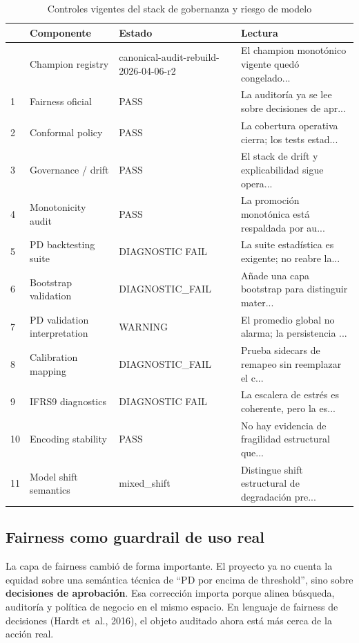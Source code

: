\documentclass[
  spanish,
  11pt,
  letterpaper,
]{scrbook}
\theoremstyle{plain}
\theoremstyle{remark}
\begin{document}
{

\begin{longtable}[]{@{}llll@{}}

\caption{\label{tbl-mrm-current-controls}Controles vigentes del stack de
gobernanza y riesgo de modelo}

\tabularnewline

\toprule\noalign{}
& Componente & Estado & Lectura \\
\midrule\noalign{}
\endhead
\bottomrule\noalign{}
\endlastfoot
0 & Champion registry & canonical-audit-rebuild-2026-04-06-r2 & El
champion monotónico vigente quedó congelado... \\
1 & Fairness oficial & PASS & La auditoría ya se lee sobre decisiones de
apr... \\
2 & Conformal policy & PASS & La cobertura operativa cierra; los tests
estad... \\
3 & Governance / drift & PASS & El stack de drift y explicabilidad sigue
opera... \\
4 & Monotonicity audit & PASS & La promoción monotónica está respaldada
por au... \\
5 & PD backtesting suite & DIAGNOSTIC FAIL & La suite estadística es
exigente; no reabre la... \\
6 & Bootstrap validation & DIAGNOSTIC\_FAIL & Añade una capa bootstrap
para distinguir mater... \\
7 & PD validation interpretation & WARNING & El promedio global no
alarma; la persistencia ... \\
8 & Calibration mapping & DIAGNOSTIC\_FAIL & Prueba sidecars de remapeo
sin reemplazar el c... \\
9 & IFRS9 diagnostics & DIAGNOSTIC FAIL & La escalera de estrés es
coherente, pero la es... \\
10 & Encoding stability & PASS & No hay evidencia de fragilidad
estructural que... \\
11 & Model shift semantics & mixed\_shift & Distingue shift estructural
de degradación pre... \\

\end{longtable}

}

\subsection{Fairness como guardrail de uso
real}\label{fairness-como-guardrail-de-uso-real}

La capa de fairness cambió de forma importante. El proyecto ya no cuenta
la equidad sobre una semántica técnica de ``PD por encima de
threshold'', sino sobre \textbf{decisiones de aprobación}. Esa
corrección importa porque alinea búsqueda, auditoría y política de
negocio en el mismo espacio. En lenguaje de fairness de decisiones
(Hardt et~al., 2016), el objeto auditado ahora está más cerca de la
acción real.
\end{document}
